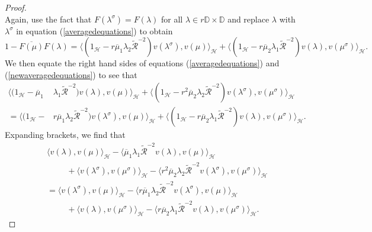 \documentclass[12pt,reqno]{amsart}
\numberwithin{equation}{section}
\theoremstyle{definition}
\begin{document}
\begin{proof}
\begin{equation}
\end{equation}
Again, use the fact that $F(\lambda^{\sigma})=F(\lambda)$ for all $\lambda\in r \mathbb{D}\times\mathbb{D}$ and replace $\lambda$ with $\lambda^{\sigma}$ in equation (\ref{averagedequations}) to obtain
\begin{equation}\label{newaveragedequations}
1-\overline{F(\mu)}F(\lambda) = \Big\langle(1_{\mathcal{H}}-r\overline{\mu}_{1}\lambda_{2}\widetilde{\mathcal{R}}^{-2})v(\lambda^{\sigma}),v(\mu)\Big\rangle_{\mathcal{H}}+\Big\langle(1_{\mathcal{H}}-r\overline{\mu}_{2}\lambda_{1}\widetilde{\mathcal{R}}^{-2})v({\lambda}),v({\mu}^{\sigma})\Big\rangle_{\mathcal{H}}.
\end{equation}
We then equate the right hand sides of equations (\ref{averagedequations}) and (\ref{newaveragedequations}) to see that
\begin{align*}
\Big\langle(1_{\mathcal{H}}-\overline{\mu}_{1}&\lambda_{1}\widetilde{\mathcal{R}}^{-2})v({\lambda}),v({\mu})\Big\rangle_{\mathcal{H}}+\Big\langle(1_{\mathcal{H}}-r^{2}\overline{\mu}_{2}\lambda_{2}\widetilde{\mathcal{R}}^{-2})v({\lambda}^{\sigma}),v({\mu}^{\sigma})\Big\rangle_{\mathcal{H}}\nonumber \\ 
= \Big\langle(1_{\mathcal{H}}-&r\overline{\mu}_{1}\lambda_{2}\widetilde{\mathcal{R}}^{-2})v(\lambda^{\sigma}),v(\mu)\Big\rangle_{\mathcal{H}}+\Big\langle(1_{\mathcal{H}}-r\overline{\mu}_{2}\lambda_{1}\widetilde{\mathcal{R}}^{-2})v({\lambda}),v({\mu}^{\sigma})\Big\rangle_{\mathcal{H}}. 
\end{align*}
Expanding brackets, we find that
\begin{align}
& \Big\langle v(\lambda), v(\mu) \Big\rangle_{\mathcal{H}} -  \Big\langle \overline{\mu}_{1}\lambda_{1} \widetilde{\mathcal{R}}^{-2} v(\lambda), v(\mu)\Big\rangle_{\mathcal{H}} \nonumber\\
& \hspace{1cm} + \Big\langle v(\lambda^{\sigma}), v(\mu^{\sigma})\Big\rangle_{\mathcal{H}} - \Big\langle r^{2}\overline{\mu}_{2}\lambda_{2}\widetilde{\mathcal{R}}^{-2}v(\lambda^{\sigma}), v(\mu^{\sigma}) \Big\rangle_{\mathcal{H}} \nonumber \\
& =\Big\langle v(\lambda^{\sigma}), v(\mu) \Big\rangle_{\mathcal{H}} - \Big\langle r\overline{\mu}_{1}\lambda_{2}\widetilde{\mathcal{R}}^{-2}v(\lambda^{\sigma}), v(\mu) \Big\rangle_{\mathcal{H}}
\nonumber\\
& \hspace{1cm} + \Big\langle v(\lambda), v(\mu^{\sigma})\Big\rangle_{\mathcal{H}}-\Big\langle r\overline{\mu}_{2}\lambda_{1}\widetilde{\mathcal{R}}^{-2}v(\lambda),v(\mu^{\sigma})\Big\rangle_{\mathcal{H}} \label{rearrangingthisequation}.

\end{align}
\end{proof}
\end{document}
